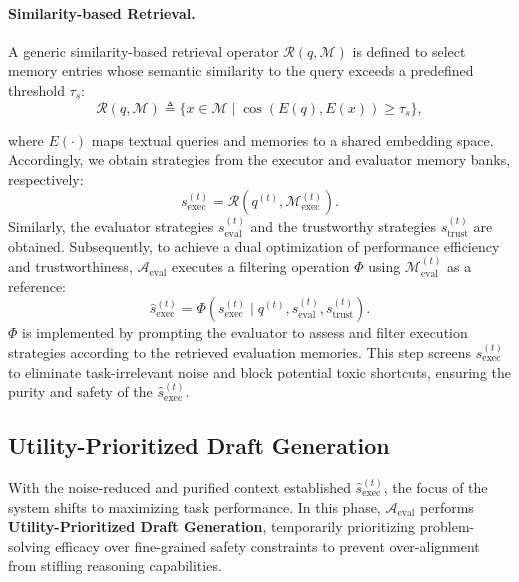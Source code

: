 \documentclass{article}
\theoremstyle{plain}
\theoremstyle{definition}
\theoremstyle{remark}
\begin{document}
\paragraph{Similarity-based Retrieval.}
A generic similarity-based retrieval operator $\mathcal{R}(q, \mathcal{M})$ is defined to select memory entries whose semantic similarity to the query exceeds a predefined threshold $\tau_s$:
\begin{equation}
    \mathcal{R}(q, \mathcal{M}) \triangleq \{x \in \mathcal{M} \mid \cos(E(q), E(x)) \ge \tau_s\},
\end{equation}

where $E(\cdot)$ maps textual queries and memories to a shared embedding space. Accordingly, we obtain strategies from the executor and evaluator memory banks, respectively:
\begin{equation}
    s_{\text{exec}}^{(t)} = \mathcal{R}(q^{(t)}, \mathcal{M}_{\text{exec}}^{(t)}).
\end{equation}
Similarly, the evaluator strategies $s_{\text{eval}}^{(t)}$ and the trustworthy strategies $s_{\text{trust}}^{(t)}$ are obtained. Subsequently, to achieve a dual optimization of performance efficiency and trustworthiness, $\mathcal{A}_{\text{eval}}$ executes a filtering operation $\Phi$ using $\mathcal{M}_{\text{eval}}^{(t)}$ as a reference:
\begin{equation}
    \hat{s}_{\text{exec}}^{(t)} = \Phi(s_{\text{exec}}^{(t)} \mid q^{(t)}, s_{\text{eval}}^{(t)},
    s_{\text{trust}}^{(t)}).
\end{equation}
$\Phi$ is implemented by prompting the evaluator to assess and filter execution strategies according to the retrieved evaluation memories. This step screens $s_{\text{exec}}^{(t)}$ to eliminate task-irrelevant noise and block potential toxic shortcuts, ensuring the purity and safety of the $\hat{s}_{\text{exec}}^{(t)}$.

\subsection{Utility-Prioritized Draft Generation}
With the noise-reduced and purified context established $\hat{s}_{\text{exec}}^{(t)}$, the focus of the system shifts to maximizing task performance. In this phase, $\mathcal{A}_{\text{eval}}$ performs \textbf{Utility-Prioritized Draft Generation}, temporarily prioritizing problem-solving efficacy over fine-grained safety constraints to prevent over-alignment from stifling reasoning capabilities.
\end{document}
